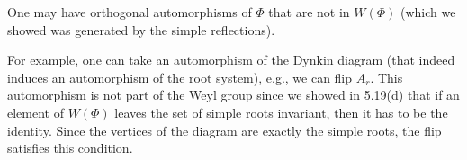 One may have orthogonal automorphisms of $\Phi$ that are not in $W(\Phi)$ (which
we showed was generated by the simple reflections).

For example, one can take an automorphism of the Dynkin diagram (that indeed
induces an automorphism of the root system), e.g., we can flip $A_r$. This
automorphism is not part of the Weyl group since we showed in 5.19(d) that
if an element of $W(\Phi)$ leaves the set of simple roots invariant, then it
has to be the identity. Since the vertices of the diagram are exactly
the simple roots, the flip satisfies this condition.
